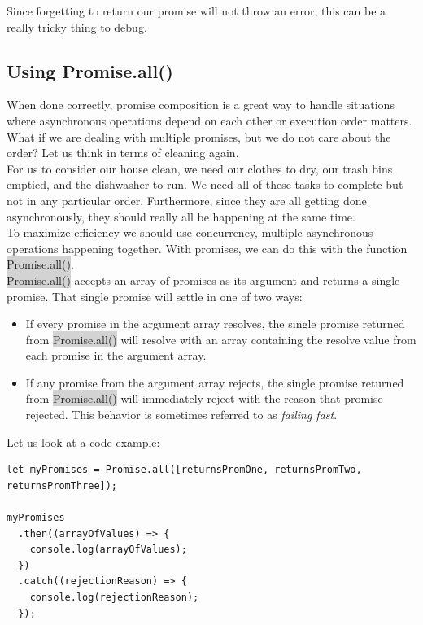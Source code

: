 \documentclass[11pt]{article}
\begin{document}
Since forgetting to return our promise will not throw an error, this can be a really tricky thing to debug. 

\subsection{Using Promise.all()}
When done correctly, promise composition is a great way to handle situations where asynchronous operations depend on each other or execution order matters. What if we are dealing with multiple promises, but we do not care about the order? Let us think in terms of cleaning again. \\
\newline
For us to consider our house clean, we need our clothes to dry, our trash bins emptied, and the dishwasher to run. We need all of these tasks to complete but not in any particular order. Furthermore, since they are all getting done asynchronously, they should really all be happening at the same time. \\
\newline
To maximize efficiency we should use concurrency, multiple asynchronous operations happening together. With promises, we can do this with the function \colorbox{lightgray}{Promise.all()}. \\
\newline
\colorbox{lightgray}{Promise.all()} accepts an array of promises as its argument and returns a single promise. That single promise will settle in one of two ways:
\begin{itemize}[leftmargin = *]
\item If every promise in the argument array resolves, the single promise returned from \colorbox{lightgray}{Promise.all()} will resolve with an array containing the resolve value from each promise in the argument array.
\item If any promise from the argument array rejects, the single promise returned from \colorbox{lightgray}{Promise.all()} will immediately reject with the reason that promise rejected. This behavior is sometimes referred to as \textit{failing fast}.
\end{itemize}
Let us look at a code example:
\begin{lstlisting}
let myPromises = Promise.all([returnsPromOne, returnsPromTwo, returnsPromThree]);

myPromises
  .then((arrayOfValues) => {
    console.log(arrayOfValues);
  })
  .catch((rejectionReason) => {
    console.log(rejectionReason);
  });
\end{lstlisting}
\end{document}
